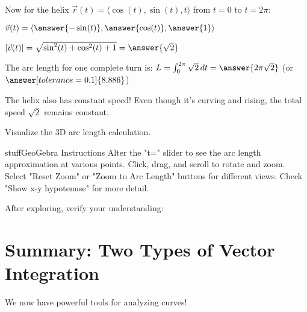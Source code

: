 \documentclass{ximera}
\begin{document}
\begin{problem}
Now for the helix $\vec{r}(t) = \langle \cos(t), \sin(t), t \rangle$ from $t=0$ to $t=2\pi$:

$\vec{v}(t) = \langle \answer{-\sin(t)}, \answer{\cos(t)}, \answer{1} \rangle$

$|\vec{v}(t)| = \sqrt{\sin^2(t) + \cos^2(t) + 1} = \answer{\sqrt{2}}$

The arc length for one complete turn is:
$L = \int_0^{2\pi} \sqrt{2} \, dt = \answer{2\pi\sqrt{2}}$ (or $\answer[tolerance=0.1]{8.886}$)

\begin{feedback}
The helix also has constant speed! Even though it's curving and rising, the total speed $\sqrt{2}$ remains constant.
\end{feedback}
\end{problem}

\begin{problem}
Visualize the 3D arc length calculation.

\begin{expandable}{stuff}{GeoGebra Instructions}
    Alter the "t=" slider to see the arc length approximation at various points. Click, drag, and scroll to rotate and zoom. Select "Reset Zoom" or "Zoom to Arc Length" buttons for different views. Check "Show x-y hypotenuse" for more detail.
\end{expandable}

\begin{center}
\end{center}

After exploring, verify your understanding:
\begin{selectAll}
\end{selectAll}
\end{problem}

\section*{Summary: Two Types of Vector Integration}

We now have powerful tools for analyzing curves!
\end{document}
